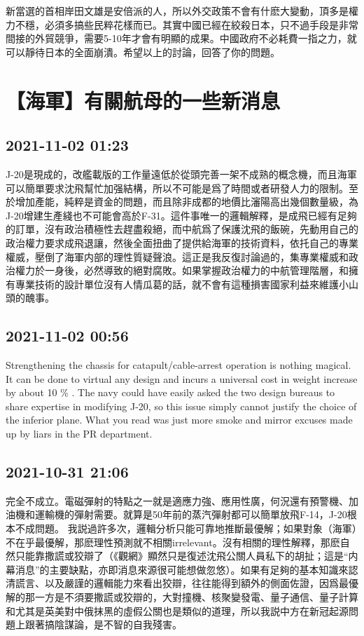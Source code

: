 \documentclass[twocolumn]{ctexart}
\begin{document}
新當選的首相岸田文雄是安倍派的人，所以外交政策不會有什麽大變動，頂多是權力不穩，必須多搞些民粹花樣而已。其實中國已經在絞殺日本，只不過手段是非常間接的外貿競爭，需要5-10年才會有明顯的成果。中國政府不必耗費一指之力，就可以靜待日本的全面崩潰。希望以上的討論，回答了你的問題。
\section*{【海軍】有關航母的一些新消息}
\subsection*{2021-11-02 01:23}

J-20是現成的，改艦載版的工作量遠低於從頭完善一架不成熟的概念機，而且海軍可以簡單要求沈飛幫忙加强結構，所以不可能是爲了時間或者研發人力的限制。至於增加產能，純粹是資金的問題，而且除非成都的地價比瀋陽高出幾個數量級，為J-20增建生產綫也不可能會高於F-31。這件事唯一的邏輯解釋，是成飛已經有足夠的訂單，沒有政治積極性去趕盡殺絕，而中航爲了保護沈飛的飯碗，先動用自己的政治權力要求成飛退讓，然後全面扭曲了提供給海軍的技術資料，依托自己的專業權威，壓倒了海軍内部的理性質疑聲浪。這正是我反復討論過的，集專業權威和政治權力於一身後，必然導致的絕對腐敗。如果掌握政治權力的中航管理階層，和擁有專業技術的設計單位沒有人情瓜葛的話，就不會有這種損害國家利益來維護小山頭的醜事。
\subsection*{2021-11-02 00:56}

Strengthening the chassis for catapult/cable-arrest operation is nothing magical. It can be done to virtual any design and incurs a universal cost in weight increase by about 10 \% . The navy could have easily asked the two design bureaus to share expertise in modifying J-20, so this issue simply cannot justify the choice of the inferior plane. What you read was just more smoke and mirror excuses made up by liars in the PR department.
\subsection*{2021-10-31 21:06}

完全不成立。電磁彈射的特點之一就是適應力強、應用性廣，何況還有預警機、加油機和運輸機的彈射需要。就算是50年前的蒸汽彈射都可以簡單放飛F-14，J-20根本不成問題。
我説過許多次，邏輯分析只能可靠地推斷最優解；如果對象（海軍）不在乎最優解，那麽理性預測就不相關irrelevant。沒有相關的理性解釋，那麽自然只能靠撒謊或狡辯了（《觀網》顯然只是復述沈飛公關人員私下的胡扯；這是“内幕消息”的主要缺點，亦即消息來源很可能想做忽悠）。如果有足夠的基本知識來認清謊言、以及嚴謹的邏輯能力來看出狡辯，往往能得到額外的側面佐證，因爲最優解的那一方是不須要撒謊或狡辯的，大對撞機、核聚變發電、量子通信、量子計算和尤其是英美對中俄抹黑的虛假公關也是類似的道理，所以我説中方在新冠起源問題上跟著搞陰謀論，是不智的自我殘害。
\end{document}
